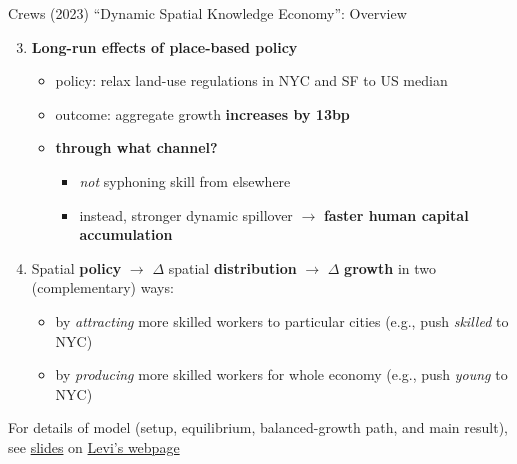 \documentclass[11pt,notes=hide,aspectratio=169]{beamer}
\begin{document}
\begin{frame}{Crews (2023) ``Dynamic Spatial Knowledge Economy'': Overview}
    \begin{enumerate}
        \setcounter{enumi}{2}
        \item \textbf{Long-run effects of place-based policy}
        \begin{itemize}
            \item policy: relax land-use regulations in NYC and SF to US median
            \item outcome: aggregate growth \textbf{increases by 13bp}
            \item \textbf{\alert{through what channel?}}
            \begin{itemize}
                \item \textit{not} syphoning skill from elsewhere
                \item instead, stronger dynamic spillover $\to$
                \textbf{\alert{faster human capital accumulation}}
            \end{itemize}
        \end{itemize}
        \pause
        \item[] Spatial \textbf{policy} $\to$ $\Delta$ spatial \textbf{distribution} $\to$ $\Delta$ \textbf{growth} in two (complementary) ways:
        \begin{itemize}
            \item by \textit{attracting} more skilled workers to particular cities (e.g., push \textit{skilled} to NYC)
            \item by \textit{producing} more skilled workers for whole economy (e.g., push \textit{young} to NYC)
        \end{itemize}
    \end{enumerate}
For details of model (setup, equilibrium, balanced-growth path, and main result), see \href{https://www.levicrews.com/files/p-dske_slides.pdf}{slides} on \href{https://www.levicrews.com/}{Levi's webpage}
\end{frame}
\end{document}
